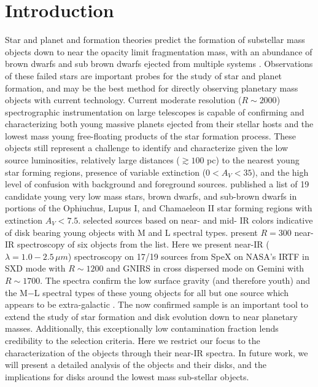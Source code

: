 \documentclass[11pt,twoside]{article}
\begin{document}
\section{Introduction}
Star and planet and formation theories predict the formation of substellar mass objects down to near the opacity limit fragmentation mass, with an abundance of brown dwarfs and sub brown dwarfs ejected from multiple systems \citep{bate02, bate09}.  Observations of these failed stars are important probes for the study of star and planet formation, and may be the best method for directly observing planetary mass objects with current technology.  Current moderate resolution ($R\sim2000$) spectrographic instrumentation on large telescopes is capable of confirming and characterizing both young massive planets ejected from their stellar hosts and the lowest mass young free-floating products of the star formation process.  These objects still represent a challenge to identify and characterize given the low source luminosities, relatively large distances ($\gtrsim 100$ pc) to the nearest young star forming regions, presence of variable extinction ($0 < A_{V} < 35$), and the high level of confusion with background and foreground sources.  \citet{allers06} published a list of 19 candidate young very low mass stars, brown dwarfs, and sub-brown dwarfs in portions of the Ophiuchus, Lupus I, and Chamaeleon II star forming regions with extinction $A_{V} < 7.5$.  \citeauthor{allers06} selected sources based on near- and mid- IR colors indicative of disk bearing young objects with M and L spectral types.  \citet{allers07} present $R=300$ near-IR spectroscopy of six objects from the \citet{allers06} list.  Here we present near-IR ($\lambda=1.0-2.5 \,\mu m$) spectroscopy on 17/19 sources from SpeX on NASA's IRTF \citep{rayner03, cushing04, vacca03} in SXD mode with $R\sim1200$ and GNIRS \citep{elias1998, elias06} in cross dispersed mode on Gemini with $R\sim1700$.  The spectra confirm the low surface gravity (and therefore youth) and the M$-$L spectral types of these young objects for all but one source which appears to be extra-galactic \citep{rayjay06}.  The now confirmed sample is an important tool to extend the study of star formation and disk evolution down to near planetary masses.  Additionally, this exceptionally low contamination fraction lends credibility to the selection criteria.  Here we restrict our focus to the characterization of the objects through their near-IR spectra.  In future work, we will present a detailed analysis of the objects and their disks, and the implications for disks around the lowest mass sub-stellar objects.
\end{document}
